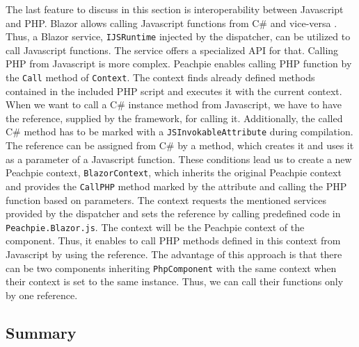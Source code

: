 The last feature to discuss in this section is interoperability between Javascript and PHP.
Blazor allows calling Javascript functions from C\# \cite{online:interop1} and vice-versa \cite{online:interop2}.
Thus, a Blazor service, \texttt{IJSRuntime} injected by the dispatcher, can be utilized to call Javascript functions.
The service offers a specialized API for that.
Calling PHP from Javascript is more complex.
Peachpie enables calling PHP function by the \texttt{Call} method of \texttt{Context}. 
The context finds already defined methods contained in the included PHP script and executes it with the current context.
When we want to call a C\# instance method from Javascript, we have to have the reference, supplied by the framework, for calling it.
Additionally, the called C\# method has to be marked with a \texttt{JSInvokableAttribute} during compilation.
The reference can be assigned from C\# by a method, which creates it and uses it as a parameter of a Javascript function.
These conditions lead us to create a new Peachpie context, \texttt{BlazorContext}, which inherits the original Peachpie context and provides the \texttt{CallPHP} method marked by the attribute and calling the PHP function based on parameters.
The context requests the mentioned services provided by the dispatcher and sets the reference by calling predefined code in \texttt{Peachpie.Blazor.js}.
The context will be the Peachpie context of the component.
Thus, it enables to call PHP methods defined in this context from Javascript by using the reference.
The advantage of this approach is that there can be two components inheriting \texttt{PhpComponent} with the same context when their context is set to the same instance.
Thus, we can call their functions only by one reference.

\subsection{Summary}

